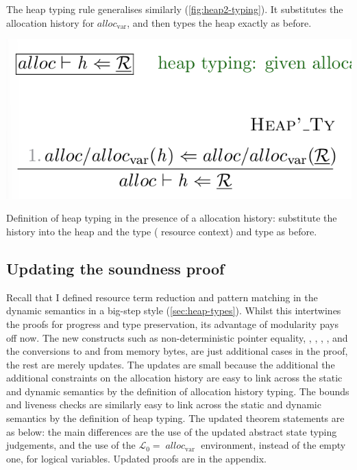 The heap typing rule generalises similarly (\cref{fig:heap2-typing}). It
substitutes the allocation history for $\mathit{alloc}_\mathrm{var}$, and then
types the heap exactly as before.

\begin{marginfigure}
    \includegraphics{figures/heap2-typing}
    \caption{Definition of heap typing in the presence of a allocation history:
        substitute the history into the heap and the type (
        resource context) and type as before.}\label{fig:heap2-typing}
\end{marginfigure}

\subsection{Updating the soundness proof}

Recall that I defined resource term reduction and pattern matching in the
dynamic semantics in a big-step style (\cref{sec:heap-types}). Whilst this
intertwines the proofs for progress and type preservation, its advantage of
modularity pays off now. The new constructs such as non-deterministic pointer
equality, , ,
, , and the conversions
to and from memory bytes, are just additional cases in the proof, the rest are
merely updates. The updates are small because the additional the additional
constraints on the allocation history are easy to link across the static and
dynamic semantics by the definition of allocation history typing. The bounds
and liveness checks are similarly easy to link across the static and dynamic
semantics by the definition of heap typing. The updated theorem statements are
as below: the main differences are the use of the updated abstract state typing
judgements, and the use of the $\mathcal{L}_0 = {\; \mathit{alloc}_\mathrm{var}
\;}$ environment, instead of the empty one, for logical variables. Updated
proofs are in the appendix.

